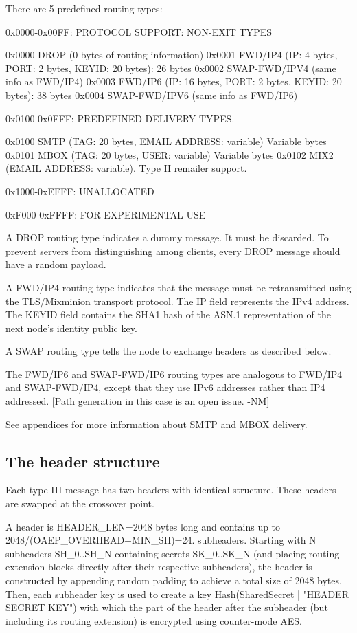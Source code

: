 There are 5 predefined routing types:

0x0000-0x00FF: PROTOCOL SUPPORT: NON-EXIT TYPES

0x0000 DROP    (0 bytes of routing information)
0x0001 FWD/IP4 (IP: 4 bytes, PORT: 2 bytes, KEYID: 20 bytes): 26 bytes
0x0002 SWAP-FWD/IPV4 (same info as FWD/IP4)
0x0003 FWD/IP6 (IP: 16 bytes, PORT: 2 bytes, KEYID: 20 bytes): 38 bytes
0x0004 SWAP-FWD/IPV6 (same info as FWD/IP6)

0x0100-0x0FFF: PREDEFINED DELIVERY TYPES.

0x0100 SMTP   (TAG: 20 bytes, EMAIL ADDRESS: variable) Variable bytes
0x0101 MBOX   (TAG: 20 bytes, USER: variable) Variable bytes
0x0102 MIX2   (EMAIL ADDRESS: variable).  Type II remailer support.

0x1000-0xEFFF: UNALLOCATED

0xF000-0xFFFF: FOR EXPERIMENTAL USE

A DROP routing type indicates a dummy message. It must be discarded.
To prevent servers from distinguishing among clients, every DROP
message should have a random payload.

A FWD/IP4 routing type indicates that the message must be
retransmitted using the TLS/Mixminion transport protocol. The IP field
represents the IPv4 address.  The KEYID field contains the SHA1 hash
of the ASN.1 representation of the next node's identity public key.

A SWAP routing type tells the node to exchange headers as described below.

The FWD/IP6 and SWAP-FWD/IP6 routing types are analogous to FWD/IP4
and SWAP-FWD/IP4, except that they use IPv6 addresses rather than IP4
addressed.  [Path generation in this case is an open issue. -NM]

See appendices for more information about SMTP and MBOX delivery.

\subsection{The header structure}

Each type III message has two headers with identical structure. These
headers are swapped at the crossover point.

A header is HEADER_LEN=2048 bytes long and contains up to
2048/(OAEP_OVERHEAD+MIN_SH)=24.
subheaders. Starting with N subheaders SH_0..SH_N containing secrets
SK_0..SK_N (and placing routing extension blocks directly after their
respective subheaders), the header is constructed by appending 
random padding to achieve a total size
of 2048 bytes. Then, each subheader key is used to create a key
Hash(SharedSecret | "HEADER SECRET KEY") with which the part of the
header after the subheader (but including its routing extension) is
encrypted using counter-mode AES.

